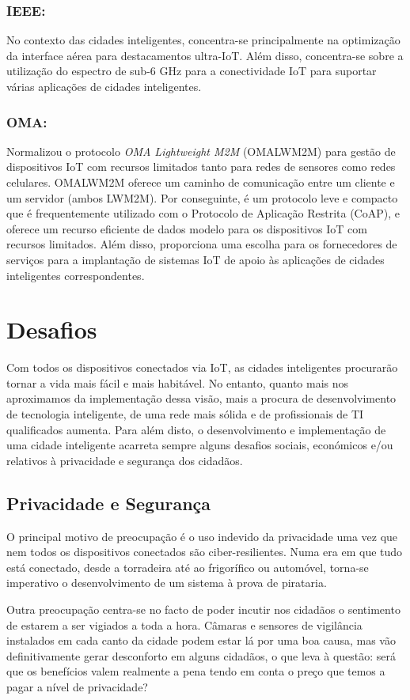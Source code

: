 \documentclass{llncs}
\begin{document}
    \subsubsection{IEEE:} 
    No contexto das cidades inteligentes, concentra-se principalmente na optimização da interface aérea
    para destacamentos ultra-IoT. Além disso, concentra-se sobre a utilização do espectro de sub-6 GHz para a conectividade IoT para suportar várias aplicações de cidades inteligentes.
    
    \subsubsection{OMA:} 
    Normalizou o protocolo \textit{OMA Lightweight M2M} (OMALWM2M) para gestão de dispositivos IoT com
    recursos limitados tanto para redes de sensores como redes celulares. OMALWM2M oferece um caminho de comunicação
    entre um cliente e um servidor (ambos LWM2M). Por conseguinte, é um protocolo leve e compacto que é
    frequentemente utilizado com o Protocolo de Aplicação Restrita (CoAP), e oferece um recurso eficiente de
    dados modelo para os dispositivos IoT com recursos limitados. Além disso, proporciona uma escolha para os
    fornecedores de serviços para a implantação de sistemas IoT de apoio às aplicações de cidades
    inteligentes correspondentes.
    
    
    
\section{Desafios}
Com todos os dispositivos conectados via IoT, as cidades inteligentes procurarão
tornar a vida mais fácil e mais habitável. No entanto, quanto mais nos
aproximamos da implementação dessa visão, mais a procura
de desenvolvimento de tecnologia inteligente, de uma rede mais sólida
e de profissionais de TI qualificados aumenta. Para além disto, o desenvolvimento e implementação de uma cidade inteligente acarreta sempre alguns desafios sociais, económicos e/ou relativos à privacidade e segurança dos cidadãos.

    \subsection{Privacidade e Segurança}
    \par O principal motivo de preocupação é o uso indevido da privacidade
    uma vez que nem todos os dispositivos conectados são ciber-resilientes.
    Numa era em que tudo está conectado, desde a torradeira até ao 
    frigorífico ou automóvel, torna-se imperativo o desenvolvimento de um 
    sistema à prova de pirataria.
    \par Outra preocupação centra-se no facto de poder incutir nos
    cidadãos o sentimento de estarem a ser vigiados a 
    toda a hora. Câmaras e sensores de vigilância instalados em cada 
    canto da cidade podem estar lá por uma boa causa, mas vão 
    definitivamente gerar desconforto em alguns cidadãos, o que leva
    à questão: será que os benefícios valem realmente a pena tendo em conta
    o preço que temos a pagar a nível de privacidade?
    
\end{document}
